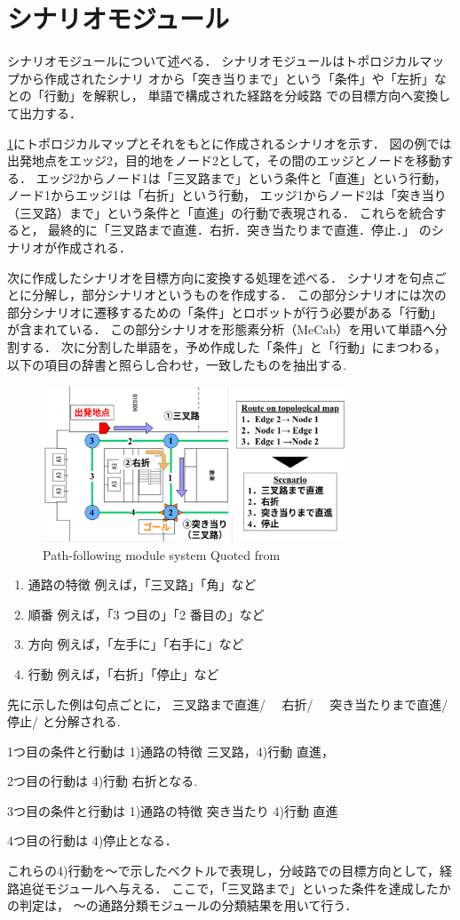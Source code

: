 \section{シナリオモジュール}
シナリオモジュールについて述べる．
シナリオモジュールはトポロジカルマップから作成されたシナリ
オから「突き当りまで」という「条件」や「左折」なとの「行動」を解釈し，
単語で構成された経路を分岐路 での目標方向へ変換して出力する．

\ref{fig:topo2sce}にトポロジカルマップとそれをもとに作成されるシナリオを示す．
図の例では出発地点をエッジ2，目的地をノード2として，その間のエッジとノードを移動する．
エッジ2からノード1は「三叉路まで」という条件と「直進」という行動，
ノード1からエッジ1は「右折」という行動，
エッジ1からノード2は「突き当り（三叉路）まで」という条件と「直進」の行動で表現される．
これらを統合すると，
最終的に「三叉路まで直進．右折．突き当たりまで直進．停止．」
のシナリオが作成される．

次に作成したシナリオを目標方向に変換する処理を述べる．
シナリオを句点ごとに分解し，部分シナリオというものを作成する．
この部分シナリオには次の部分シナリオに遷移するための「条件」とロボットが行う必要がある「行動」
が含まれている．
この部分シナリオを形態素分析（MeCab\cite{2004ConditionalRF}）を用いて単語へ分割する．
次に分割した単語を，予め作成した「条件」と「行動」にまつわる，
以下の項目の辞書と照らし合わせ，一致したものを抽出する.
\begin{figure}[htbp]
    \centering
     \includegraphics[width=90mm]{images/pdf/topo2sce.pdf}
     \caption{Path-following module system Quoted from \cite{haruyama2023}}
     \label{fig:topo2sce}
\end{figure}

\begin{enumerate}
    \item [1）] 通路の特徴 例えば，「三叉路」「角」など
    \item [2）] 順番 例えば，「3 つ目の」「2 番目の」など 
    \item [3）] 方向 例えば，「左手に」「右手に」など
    \item [4）] 行動 例えば，「右折」「停止」など
\end{enumerate}
先に示した例は句点ごとに，
三叉路まで直進/　
右折/　  
突き当たりまで直進/　 
停止/ 
と分解される.

1つ目の条件と行動は 
1)通路の特徴 三叉路，4)行動 直進，

2つ目の行動は 4)行動 右折となる.

3つ目の条件と行動は
1)通路の特徴 突き当たり 4)行動 直進

4つ目の行動は
4)停止となる．

これらの4)行動を〜で示したベクトルで表現し，分岐路での目標方向として，経路追従モジュールへ与える．
ここで，「三叉路まで」といった条件を達成したかの判定は，
〜の通路分類モジュールの分類結果を用いて行う．
